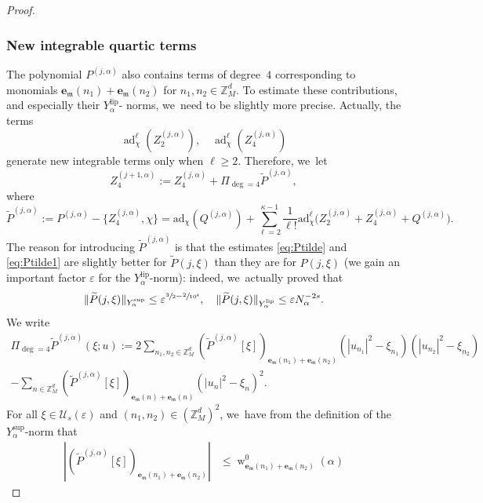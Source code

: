 \documentclass[10pt,a4paper]{amsart}
\DeclareMathOperator{\rw}{w}
\theoremstyle{plain}
\theoremstyle{definition}
\newcommand{\Z}{\mathbb{Z}}
\newcommand{\1}{\mathbf{1}}
\newcommand{\Ysup}[1]{Y_{#1}^{\mathrm{sup}}}
\newcommand{\Ylip}[1]{Y_{#1}^{\mathrm{lip}}}
\let\epsilon\varepsilon
\begin{document}
\begin{proof}
\subsubsection*{New integrable quartic terms} The polynomial $P^{(j,\alpha)}$ also contains terms of degree~$4$ corresponding to monomials $\boldsymbol{e}_{\mathfrak{m}}(n_1)+\boldsymbol{e}_{\mathfrak{m}}(n_2)$ for $n_{1},n_{2}\in\Z_{M}^{d}$. To estimate these contributions, and especially their $\Ylip{\alpha}$- norms, we~need to be slightly more precise. Actually, the terms
\[
\operatorname{ad}_{\chi}^{\ell}(Z_{2}^{(j,\alpha)}),\quad \operatorname{ad}_{\chi}^{\ell}(Z_{4}^{(j,\alpha)})
\]
generate new integrable terms only when $\ell\geq2$. Therefore, we~let
\begin{equation}
\label{eq:4+1}
Z_{4}^{(j+1,\alpha)} := Z_{4}^{(j,\alpha)} + \Pi_{\deg=4}\widetilde{P}^{(j,\alpha)},
\end{equation}
where
\[
\widetilde{P}^{(j,\alpha)}
:= P^{(j,\alpha)} - \{Z_{4}^{(j,\alpha)},\chi\}
=
\mathrm{ad}_{\chi}(Q^{(j,\alpha)})
+\sum_{\ell=2}^{\kappa-1}
\frac{1}{\ell!}
\mathrm{ad}_{\chi}^{\ell}
\big(
Z_{2}^{(j,\alpha)}+Z_{4}^{(j,\alpha)}+Q^{(j,\alpha)}
\big).
\]
The reason for introducing $\widetilde{P}^{(j,\alpha)}$ is that the estimates \eqref{eq:Ptilde} and \eqref{eq:Ptilde1} are slightly better for $\widetilde{P}(j,\xi)$ than they are for $P(j,\xi)$ (we gain an important factor $\epsilon$ for the $\Ylip{\alpha}$-norm): indeed, we~actually proved that
\[
\|\widetilde{P}(j,\xi)\|_{\Ysup{\alpha}}
\leq
\epsilon^{\sfrac{3}{2}-\sfrac{2}{10^{4}}},
\quad
\|\widetilde{P}(j,\xi)\|_{\Ylip{\alpha}}
\leq
\epsilon N_{\alpha}^{-2s}.
\]
We write
\begin{multline*}
\Pi_{\deg=4}\widetilde{P}^{(j,\alpha)}(\xi;u)
:=
2\sum_{n_{1},n_{2}\in\Z_{M}^{d}}
(\widetilde{P}^{(j,\alpha)}[\xi])_{\boldsymbol{e}_{\mathfrak{m}}(n_1)+\boldsymbol{e}_{\mathfrak{m}}(n_2)}
(|u_{n_{1}}|^{2}-\xi_{n_{1}})(|u_{n_{2}}|^{2}-\xi_{n_{2}})
\\
-
\sum_{n\in\Z_{M}^{d}}
(\widetilde{P}^{(j,\alpha)}[\xi])_{\boldsymbol{e}_{\mathfrak{m}}(n)+\boldsymbol{e}_{\mathfrak{m}}(n)}
(|u_{n}|^{2}-\xi_{n})^{2}.
\end{multline*}
For all $\xi\in\mathcal{U}_{s}(\epsilon)$ and $(n_{1},n_{2})\in(\Z_{M}^{d})^{2}$, we~have from the definition of the $\Ysup{\alpha}$-norm that
\begin{align*}
|(\widetilde{P}^{(j,\alpha)}[\xi])_{\boldsymbol{e}_{\mathfrak{m}}(n_1)+\boldsymbol{e}_{\mathfrak{m}}(n_2)}|
&\leq
\rw_{\boldsymbol{e}_{\mathfrak{m}}(n_1)+\boldsymbol{e}_{\mathfrak{m}}(n_2)}^{0}(\alpha)

\end{align*}
\end{proof}
\end{document}
